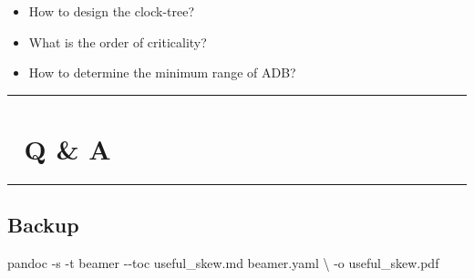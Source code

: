 \documentclass[
]{article}
\newenvironment{Shaded}{}{}
\newcommand{\AttributeTok}[1]{\textcolor[rgb]{0.49,0.56,0.16}{#1}}
\newcommand{\DataTypeTok}[1]{\textcolor[rgb]{0.56,0.13,0.00}{#1}}
\newcommand{\ExtensionTok}[1]{#1}
\newcommand{\NormalTok}[1]{#1}
\providecommand{\tightlist}{%
  \setlength{\itemsep}{0pt}\setlength{\parskip}{0pt}}
\begin{document}
\begin{itemize}
\tightlist
\item
  How to design the clock-tree?
\item
  What is the order of criticality?
\item
  How to determine the minimum range of ADB?
\end{itemize}

\begin{center}\rule{0.5\linewidth}{0.5pt}\end{center}

\section{🙋 Q \& A}\label{q-a}

\begin{center}\rule{0.5\linewidth}{0.5pt}\end{center}

\subsection{Backup}\label{backup}

\begin{Shaded}
\begin{Highlighting}[]
\ExtensionTok{pandoc} \AttributeTok{{-}s} \AttributeTok{{-}t}\NormalTok{ beamer }\AttributeTok{{-}{-}toc}\NormalTok{ useful\_skew.md beamer.yaml }\DataTypeTok{\textbackslash{}}
       \AttributeTok{{-}o}\NormalTok{ useful\_skew.pdf}
\end{Highlighting}
\end{Shaded}
\end{document}
